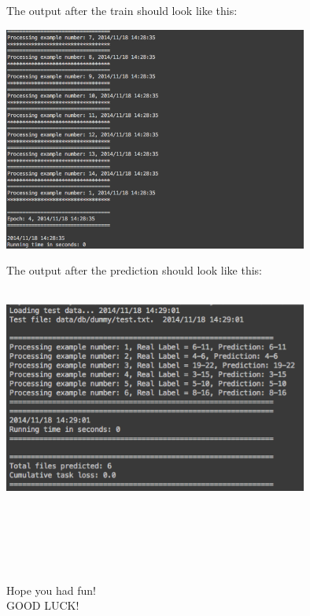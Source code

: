 \documentclass[11pt, oneside]{article}   	%
\begin{document}
The output after the train should look like this: \\ 
\centerline{\includegraphics[width=10cm]{img/train.png}}

The output after the prediction should look like this:\\ \\
\centerline{\includegraphics[width=10cm]{img/predict.png}} \\ \\ \\ \\ \\
Hope you had fun!\\
GOOD LUCK! 
\end{document}
